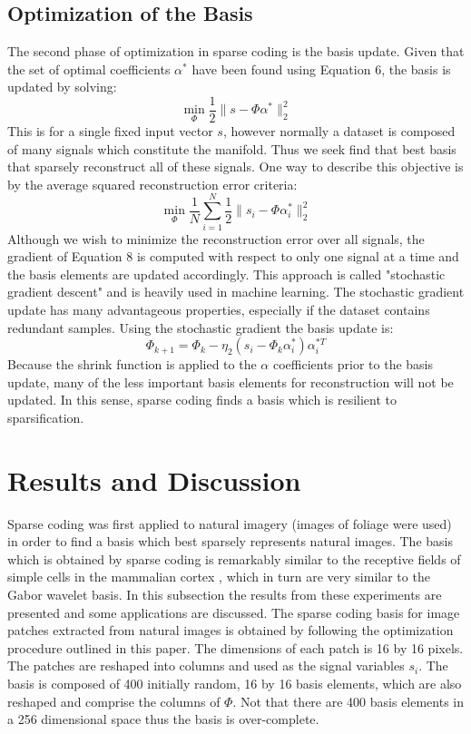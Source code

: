 \documentclass[12pt,a4paper]{article}
\begin{document}
\subsection{Optimization of the Basis}
The second phase of optimization in sparse coding is the basis update. Given that the set of optimal coefficients $\alpha^*$ have been found using Equation 6, the basis is updated by solving: 
\begin{equation}
\min_{\Phi} \frac{1}{2} \|s - \Phi \alpha^* \|_2 ^2 
\end{equation} 
This is for a single fixed input vector $s$, however normally a dataset is composed of many signals which constitute the manifold. Thus we seek find that best basis that sparsely reconstruct all of these signals. One way to describe this objective is by the average squared reconstruction error criteria: 
\begin{equation}
\min_{\Phi} \frac{1}{N}\sum_{i = 1} ^N \frac{1}{2} \|s_i - \Phi \alpha_i^* \|_2 ^2 
\end{equation}
Although we wish to minimize the reconstruction error over all signals, the gradient of Equation 8 is computed with respect to only one signal at a time and the basis elements are updated accordingly. This approach is called "stochastic gradient descent" \cite{Yann} and is heavily used in machine learning. The stochastic gradient update has many advantageous properties, especially if the dataset contains redundant samples. Using the stochastic gradient the basis update is: 
\begin{equation}
\Phi_{k+1} = \Phi_k - \eta_2 (s_i - \Phi_k \alpha_i^*)\alpha_i^{*T}
\end{equation} 
Because the shrink function is applied to the $\alpha$ coefficients prior to the basis update, many of the less important basis elements for reconstruction will not be updated. In this sense, sparse coding finds a basis which is resilient to sparsification. 
\newpage
\section{Results and Discussion} 
Sparse coding was first applied to natural imagery (images of foliage were used) in order to find a basis which best sparsely represents natural images. The basis which is obtained by sparse coding is remarkably similar to the receptive fields of simple cells in the mammalian cortex \cite{Sparse Coding}, which in turn are very similar to the Gabor wavelet basis. In this subsection the results from these experiments are presented and some applications are discussed. The sparse coding basis for image patches extracted from natural images is obtained by following the optimization procedure outlined in this paper. The dimensions of each patch is 16 by 16 pixels. The patches are reshaped into columns and used as the signal variables $s_i$. The basis is composed of 400 initially random, 16 by 16 basis elements, which are also reshaped and comprise the columns of $\Phi$. Not that there are 400 basis elements in a 256 dimensional space thus the basis is over-complete.   
\end{document}
